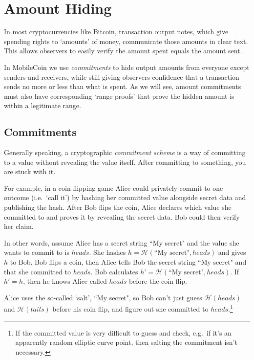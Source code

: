 \chapter{Amount Hiding}
\label{chapter:pedersen-commitments}

In most cryptocurrencies like Bitcoin, transaction output notes, which give spending rights to `amounts' of money, communicate those amounts in clear text. This allows observers to easily verify the amount spent equals the amount sent.

In MobileCoin we use {\em commitments} to hide output amounts from everyone except senders and receivers, while still giving observers confidence that a transaction sends no more or less than what is spent. As we will see, amount commitments must also have corresponding `range proofs' that prove the hidden amount is within a legitimate range.



\section{Commitments}
\label{sec:commitments}

Generally speaking, a cryptographic {\em commitment scheme} is a way of committing to a value without revealing the value itself. After committing to something, you are stuck with it.

For example, in a coin-flipping game Alice could privately commit to one outcome (i.e.\ ‘call it’) by hashing her committed value alongside secret data and publishing the hash. After Bob flips the coin, Alice declares which value she committed to and proves it by revealing the secret data. Bob could then verify her claim.

In other words, assume Alice has a secret string ``My secret" and the value she wants to commit to is $heads$. She hashes $h = \mathcal{H}(\textrm{``My secret"}, heads)$ and gives $h$ to Bob. Bob flips a coin, then Alice tells Bob the secret string ``My secret" and that she committed to $heads$. Bob calculates $h’ = \mathcal{H}(\textrm{``My secret"}, heads)$. If $h' = h$, then he knows Alice called $heads$ before the coin flip.

Alice uses the so-called `salt', ``My secret", so Bob can't just guess $\mathcal{H}(heads)$ and $\mathcal{H}(tails)$ before his coin flip, and figure out she committed to $heads$.\footnote{If the committed value is very difficult to guess and check, e.g.\ if it's an apparently random elliptic curve point, then salting the commitment isn't necessary.}



